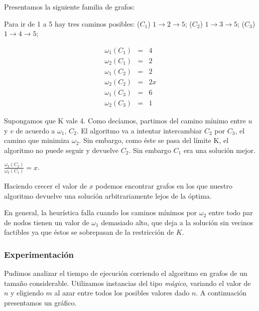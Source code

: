 Presentamos la siguiente familia de grafos:


Para ir de 1 a 5 hay tres caminos posibles: ($C_1$) $1 \rightarrow 2 \rightarrow 5$; ($C_2$) $1 \rightarrow 3 \rightarrow 5$;
($C_3$) $1 \rightarrow 4 \rightarrow 5$;

\begin{eqnarray}
 \omega_1(C_1) &=& 4	\\ 
 \omega_2(C_1) &=& 2	\\
 \omega_1(C_2) &=& 2	\\
 \omega_2(C_2) &=& 2x   \\
 \omega_1(C_3) &=& 6	\\
 \omega_2(C_3) &=& 1
\end{eqnarray}

Supongamos que K vale 4.
Como decíamos, partimos del camino mínimo entre $u$ y $v$ de acuerdo a $\omega_1$, $C_2$. El algoritmo va a intentar intercambiar $C_2$ por
$C_3$, el camino que minimiza $\omega_2$. Sin embargo, como éste se pasa del límite K, el algoritmo no puede seguir y devuelve $C_2$. Sin
embargo $C_1$ era una solución mejor.

$\frac{\omega_2(C_2)}{\omega_2(C_1)} = x$.

Haciendo crecer el valor de $x$ podemos encontrar grafos en los que nuestro algoritmo devuelve una
solución arbitrariamente lejos de la óptima.

En general, la heurística falla cuando los caminos mínimos por $\omega_2$ entre todo par de nodos tienen un valor de $\omega_1$ demasiado alto, que deja a la solución sin vecinos factibles ya que éstos se sobrepasan de la restricción de $K$.
\newpage

\subsubsection{Experimentación}

Pudimos analizar el tiempo de ejecución corriendo el algoritmo en grafos de un tamaño considerable. Utilizamos instancias del tipo \textit{mágico}, variando el valor de $n$ y eligiendo $m$ al azar entre todos los posibles valores dado $n$.  A continuación presentamos un gráfico.

